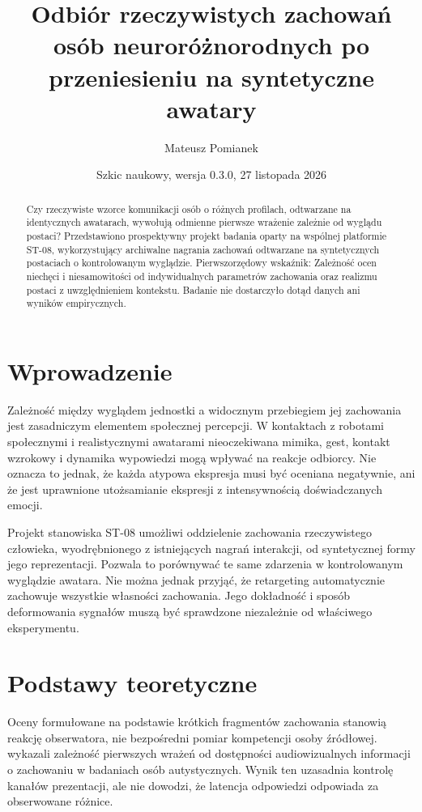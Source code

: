 \documentclass[11pt,a4paper]{article}
\title{Odbiór rzeczywistych zachowań osób neuroróżnorodnych po przeniesieniu na syntetyczne awatary}
\author{Mateusz Pomianek}
\date{Szkic naukowy, wersja 0.3.0, 27 listopada 2026}
\begin{document}
\maketitle
\begin{abstract}
Czy rzeczywiste wzorce komunikacji osób o różnych profilach, odtwarzane na identycznych awatarach, wywołują odmienne pierwsze wrażenie zależnie od wyglądu postaci? Przedstawiono prospektywny projekt badania oparty na wspólnej platformie ST-08, wykorzystujący archiwalne nagrania zachowań odtwarzane na syntetycznych postaciach o kontrolowanym wyglądzie. Pierwszorzędowy wskaźnik: Zależność ocen niechęci i niesamowitości od indywidualnych parametrów zachowania oraz realizmu postaci z uwzględnieniem kontekstu. Badanie nie dostarczyło dotąd danych ani wyników empirycznych.
\end{abstract}
\section{Wprowadzenie}
Zależność między wyglądem jednostki a widocznym przebiegiem jej zachowania jest zasadniczym elementem społecznej percepcji. W kontaktach z robotami społecznymi i realistycznymi awatarami nieoczekiwana mimika, gest, kontakt wzrokowy i dynamika wypowiedzi mogą wpływać na reakcje odbiorcy. Nie oznacza to jednak, że każda atypowa ekspresja musi być oceniana negatywnie, ani że jest uprawnione utożsamianie ekspresji z intensywnością doświadczanych emocji.

Projekt stanowiska ST-08 umożliwi oddzielenie zachowania rzeczywistego człowieka, wyodrębnionego z istniejących nagrań interakcji, od syntetycznej formy jego reprezentacji. Pozwala to porównywać te same zdarzenia w kontrolowanym wyglądzie awatara. Nie można jednak przyjąć, że retargeting automatycznie zachowuje wszystkie własności zachowania. Jego dokładność i sposób deformowania sygnałów muszą być sprawdzone niezależnie od właściwego eksperymentu.
\section{Podstawy teoretyczne}
Oceny formułowane na podstawie krótkich fragmentów zachowania stanowią reakcję obserwatora, nie bezpośredni pomiar kompetencji osoby źródłowej. \textcite{sasson2017} wykazali zależność pierwszych wrażeń od dostępności audiowizualnych informacji o zachowaniu w badaniach osób autystycznych. Wynik ten uzasadnia kontrolę kanałów prezentacji, ale nie dowodzi, że latencja odpowiedzi odpowiada za obserwowane różnice.
\end{document}
